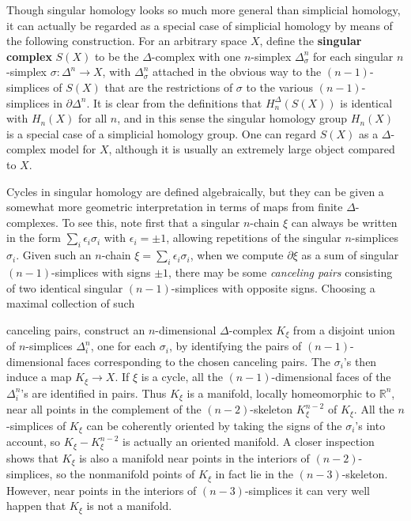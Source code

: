 Though singular homology looks so much more general than simplicial homology,
it can actually be regarded as a special case of simplicial homology by means of the
following construction. For an arbitrary space $X$, define the \textbf{singular complex} $S(X)$
to be the $\Delta$-complex with one $n$-simplex $\Delta^n_\sigma$ for each singular $n$-simplex $\sigma:\Delta^n \to X$,
with $\Delta^n_\sigma$ attached in the obvious way to the $(n-1)$-simplices of $S(X)$ that are the
restrictions of $\sigma$ to the various $(n-1)$-simplices in $\partial\Delta^n$. It is clear from the definitions that $H^\Delta_n(S(X))$ is identical with $H_n(X)$ for all $n$, and in this sense the singular
homology group $H_n(X)$ is a special case of a simplicial homology group. One can
regard $S(X)$ as a $\Delta$-complex model for $X$, although it is usually an extremely large
object compared to $X$.

Cycles in singular homology are defined algebraically, but they can be given a
somewhat more geometric interpretation in terms of maps from finite $\Delta$-complexes.
To see this, note first that a singular $n$-chain $\xi$ can always be written in the form
$\sum_i \epsilon_i \sigma_i$ with $\epsilon_i = \pm 1$, allowing repetitions of the singular $n$-simplices $\sigma_i$. Given such
an $n$-chain $\xi = \sum_i \epsilon_i \sigma_i$, when we compute $\partial \xi$ as a sum of singular $(n-1)$-simplices
with signs $\pm 1$, there may be some \textit{canceling pairs} consisting of two identical singular
$(n-1)$-simplices with opposite signs. Choosing a maximal collection of such

canceling pairs, construct an $n$-dimensional $\Delta$-complex $K_\xi$ from a disjoint union of
$n$-simplices $\Delta^n_i$, one for each $\sigma_i$, by identifying the pairs of $(n-1)$-dimensional faces
corresponding to the chosen canceling pairs. The $\sigma_i$'s then induce a map $K_\xi \to X$. If
$\xi$ is a cycle, all the $(n-1)$-dimensional faces of the $\Delta^n_i$'s are identified in pairs. Thus
$K_\xi$ is a manifold, locally homeomorphic to $\mathbb{R}^n$, near all points in the complement
of the $(n-2)$-skeleton $K^{n-2}_\xi$ of $K_\xi$. All the $n$-simplices of $K_\xi$ can be coherently
oriented by taking the signs of the $\sigma_i$'s into account, so $K_\xi - K^{n-2}_\xi$ is actually an
oriented manifold. A closer inspection shows that $K_\xi$ is also a manifold near points
in the interiors of $(n-2)$-simplices, so the nonmanifold points of $K_\xi$ in fact lie in
the $(n-3)$-skeleton. However, near points in the interiors of $(n-3)$-simplices it can
very well happen that $K_\xi$ is not a manifold.

